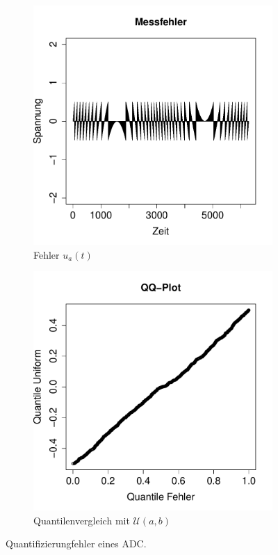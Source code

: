 \begin{figure}[h!]
\begin{subfigure}[b]{0.48\textwidth}
\includegraphics{verteilungen-050}
\caption{Fehler $u_a(t)$}
\end{subfigure}
\begin{subfigure}[b]{0.48\textwidth}
\includegraphics{verteilungen-051}
\caption{Quantilenvergleich mit $\mathcal{U}(a,b)$}
\end{subfigure}
\caption{Quantifizierungfehler eines ADC.}
\label{fig:adc}
\end{figure}

